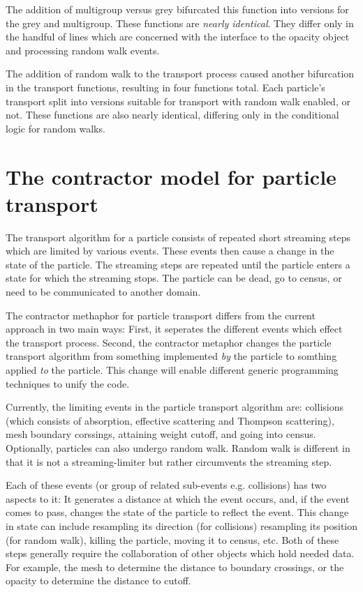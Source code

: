\documentclass[memo]{ResearchNote}
\begin{document}
The addition of multigroup versus grey bifurcated this function into
versions for the grey and multigroup. These functions are {\em nearly
  identical}. They differ only in the handful of lines which are
concerned with the interface to the opacity object and processing
random walk events.

The addition of random walk to the transport process caused another
bifurcation in the transport functions, resulting in four functions
total. Each particle's transport split into versions suitable for
transport with random walk enabled, or not. These functions are also
nearly identical, differing only in the conditional logic for random
walks.

\section{The contractor model for particle transport}

The transport algorithm for a particle consists of repeated short
streaming steps which are limited by various events. These events then
cause a change in the state of the particle. The streaming steps are
repeated until the particle enters a state for which the streaming
stops. The particle can be dead, go to census, or need to be
communicated to another domain.

The contractor methaphor for particle transport differs from the
current approach in two main ways: First, it seperates the different
events which effect the transport process. Second, the contractor
metaphor changes the particle transport algorithm from something
implemented {\em by} the particle to somthing applied {\em to} the
particle. This change will enable different generic programming
techniques to unify the code.

Currently, the limiting events in the particle transport algorithm
are: collisions (which consists of absorption, effective scattering
and Thompson scattering), mesh boundary corssings, attaining weight
cutoff, and going into census. Optionally, particles can also undergo
random walk. Random walk is different in that it is not a
streaming-limiter but rather circumvents the streaming step.

Each of these events (or group of related sub-events e.g. collisions)
has two aspects to it: It generates a distance at which the event
occurs, and, if the event comes to pass, changes the state of the
particle to reflect the event. This change in state can include
resampling its direction (for collisions) resampling its position
(for random walk), killing the particle, moving it to census,
etc. Both of these steps generally require the collaboration of other
objects which hold needed data. For example, the mesh to determine the
distance to boundary crossings, or the opacity to determine the
distance to cutoff.
\end{document}
